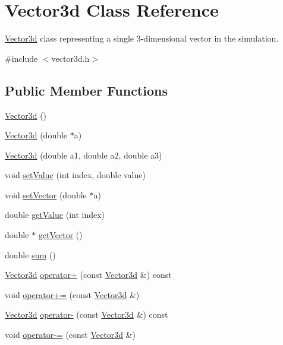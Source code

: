 \hypertarget{classVector3d}{\section{Vector3d Class Reference}
\label{df/dd0/classVector3d}
}


\hyperlink{classVector3d}{Vector3d} class representing a single 3-\/dimensional vector in the simulation.  




{\ttfamily \#include $<$vector3d.\-h$>$}

\subsection*{Public Member Functions}
\begin{DoxyCompactItemize}
\item 
\hyperlink{classVector3d_aac098d8695c4288e4844835e62945244}{Vector3d} ()
\item 
\hyperlink{classVector3d_a9e5a8c606f27fe366d2075f6bc4759a6}{Vector3d} (double $\ast$a)
\item 
\hyperlink{classVector3d_af61756bf2e679ccf2a5c0fd742ae3e6c}{Vector3d} (double a1, double a2, double a3)
\item 
void \hyperlink{classVector3d_ac20e0cda09c96f83cc41e23300c303ca}{set\-Value} (int index, double value)
\item 
void \hyperlink{classVector3d_a82c251f7203e08ec50ea55222f40525f}{set\-Vector} (double $\ast$a)
\item 
double \hyperlink{classVector3d_a37055dde72eed6770cf3b2b11b56f0f8}{get\-Value} (int index)
\item 
double $\ast$ \hyperlink{classVector3d_a12ca89ab46c79eb78fa6b75cad1a3616}{get\-Vector} ()
\item 
double \hyperlink{classVector3d_a76fa7fc5a86ba77a6764eb0d9072e90a}{sum} ()
\item 
\hyperlink{classVector3d}{Vector3d} \hyperlink{classVector3d_ad714ad56910f370335c18262dc5cc13a}{operator+} (const \hyperlink{classVector3d}{Vector3d} \&) const 
\item 
void \hyperlink{classVector3d_a034e9f847d613c9cba1cb47202b8143a}{operator+=} (const \hyperlink{classVector3d}{Vector3d} \&)
\item 
\hyperlink{classVector3d}{Vector3d} \hyperlink{classVector3d_a727932bfb1f230c8f256e10a0d45a8c7}{operator-\/} (const \hyperlink{classVector3d}{Vector3d} \&) const 
\item 
void \hyperlink{classVector3d_a14d45e123683a1f1a2ba32d43083fcd7}{operator-\/=} (const \hyperlink{classVector3d}{Vector3d} \&)

\end{DoxyCompactItemize}
